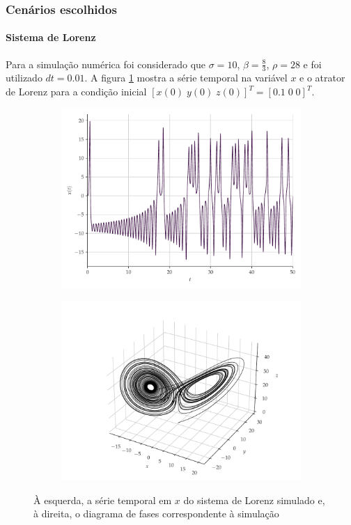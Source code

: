 \documentclass{beamer}
\begin{document}
\begin{frame}
	\frametitle{Cenários escolhidos}
	\framesubtitle{Sistema de Lorenz}
\justifying Para a simulação numérica foi considerado que $\sigma = 10$, $\beta = \frac{8}{3}$, $\rho = 28$ e foi utilizado $dt = 0.01$. A figura \ref{fig:lorenz} mostra a série temporal na variável $x$ e o atrator de Lorenz para a condição inicial $[x(0)\; y(0)\; z(0)]^T = [0.1\; 0\; 0]^T$.
\begin{figure}[H]
     \begin{subfigure}[t]{0.3\textwidth} 
         \includegraphics[scale=0.2]{serie-lorenz-x.pdf}
     \end{subfigure}
     \centering
     \begin{subfigure}[t]{0.3\textwidth}
         \includegraphics[scale=0.2]{diagrama-de-fases-lorenz.pdf}
     \end{subfigure}
     \caption{À esquerda, a série temporal em $x$ do sistema de Lorenz simulado e, à direita, o diagrama de fases correspondente à simulação}
     \label{fig:lorenz}
\end{figure}
\end{frame}
\end{document}
